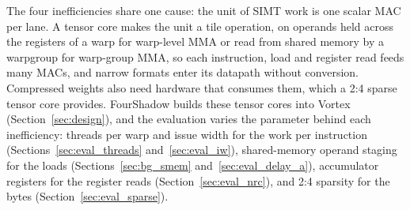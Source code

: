 The four inefficiencies share one cause: the unit of SIMT work is one scalar MAC per lane. A tensor core makes the unit a tile operation, on operands held across the registers of a warp for warp-level MMA or read from shared memory by a warpgroup for warp-group MMA, so each instruction, load and register read feeds many MACs, and narrow formats enter its datapath without conversion. Compressed weights also need hardware that consumes them, which a 2:4 sparse tensor core provides. FourShadow builds these tensor cores into Vortex (Section~\ref{sec:design}), and the evaluation varies the parameter behind each inefficiency: threads per warp and issue width for the work per instruction (Sections~\ref{sec:eval_threads} and~\ref{sec:eval_iw}), shared-memory operand staging for the loads (Sections~\ref{sec:bg_smem} and~\ref{sec:eval_delay_a}), accumulator registers for the register reads (Section~\ref{sec:eval_nrc}), and 2:4 sparsity for the bytes (Section~\ref{sec:eval_sparse}).
